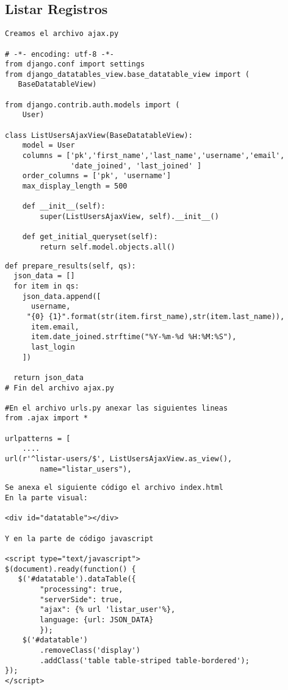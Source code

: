 \documentclass[xcolor=dvipsnames]{beamer}
\begin{document}
\subsection{Listar Registros}
\begin{frame}[fragile]
\begin{verbatim}
Creamos el archivo ajax.py

# -*- encoding: utf-8 -*-
from django.conf import settings
from django_datatables_view.base_datatable_view import (
   BaseDatatableView)
   
from django.contrib.auth.models import (
    User)

class ListUsersAjaxView(BaseDatatableView):
    model = User
    columns = ['pk','first_name','last_name','username','email',
               'date_joined', 'last_joined' ]
    order_columns = ['pk', 'username']
    max_display_length = 500
    
    def __init__(self):
        super(ListUsersAjaxView, self).__init__()

    def get_initial_queryset(self):
        return self.model.objects.all()
\end{verbatim}
\end{frame}

\begin{frame}[fragile]
\begin{verbatim}
def prepare_results(self, qs):
  json_data = []
  for item in qs:
    json_data.append([
      username,
     "{0} {1}".format(str(item.first_name),str(item.last_name)),
      item.email,
      item.date_joined.strftime("%Y-%m-%d %H:%M:%S"),
      last_login                
    ])
            
  return json_data
# Fin del archivo ajax.py

#En el archivo urls.py anexar las siguientes lineas
from .ajax import *

urlpatterns = [
    ....
url(r'^listar-users/$', ListUsersAjaxView.as_view(),
        name="listar_users"),
\end{verbatim}
\end{frame}

\begin{frame}[fragile]
\begin{verbatim}
Se anexa el siguiente código el archivo index.html
En la parte visual:

<div id="datatable"></div>

Y en la parte de código javascript

<script type="text/javascript">
$(document).ready(function() {
   $('#datatable').dataTable({
        "processing": true,
        "serverSide": true,
        "ajax": {% url 'listar_user'%},
        language: {url: JSON_DATA}
        });
    $('#datatable')
        .removeClass('display')
        .addClass('table table-striped table-bordered');
});
</script>
\end{verbatim}
\end{frame}
\end{document}
